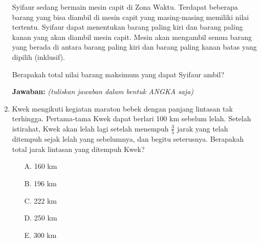 \documentclass[a4paper,11pt]{article}
\begin{document}
\begin{enumerate}
\begin{center}
\end{center}

Syifaur sedang bermain mesin capit di Zona Waktu. Terdapat beberapa barang yang bisa diambil di mesin capit yang masing-masing memiliki nilai tertentu. Syifaur dapat menentukan barang paling kiri dan barang paling kanan yang akan diambil mesin capit. Mesin akan mengambil semua barang yang berada di antara barang paling kiri dan barang paling kanan batas yang dipilih (inklusif).

Berapakah total nilai barang maksimum yang dapat Syifaur ambil?

\textbf{Jawaban:} \underline{\hspace{2cm}} \quad \emph{(tuliskan jawaban dalam bentuk ANGKA saja)}

\item  Kwek mengikuti kegiatan maraton bebek dengan panjang lintasan tak terhingga. 
    Pertama-tama Kwek dapat berlari 100 km sebelum lelah. Setelah istirahat, Kwek akan lelah lagi 
    setelah menempuh $\frac{3}{5}$ jarak yang telah ditempuh sejak lelah yang sebelumnya, dan begitu seterusnya. 
    Berapakah total jarak lintasan yang ditempuh Kwek?
    
    \begin{multicols}{5}
      \begin{itemize}
        \item[A.] 160 km
        \item[B.] 196 km
        \item[C.] 222 km
        \item[D.] 250 km
        \item[E.] 300 km
    \end{itemize}
    \end{multicols}
    


\end{enumerate}
\end{document}
